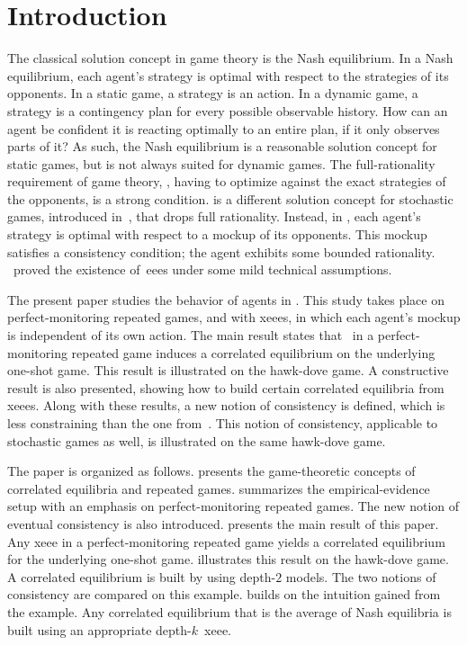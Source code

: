\section{Introduction}

The classical solution concept in game theory is the Nash equilibrium.
In a Nash equilibrium, each agent's strategy is optimal with respect to the strategies of its opponents.
In a static game, a strategy is an action.
In a dynamic game, a strategy is a contingency plan for every possible observable history.
How can an agent be confident it is reacting optimally to an entire plan, if it only observes parts of it?
As such, the Nash equilibrium is a reasonable solution concept for static games, but is not always suited for dynamic games.
The full-rationality requirement of game theory, \ie, having to optimize against the exact strategies of the opponents, is a strong condition.
 is a different solution concept for stochastic games, introduced in~\cite{dudebout_shamma:2012}, that drops full rationality.
Instead, in , each agent's strategy is optimal with respect to a mockup of its opponents.
This mockup satisfies a consistency condition; the agent exhibits some bounded rationality.
\cite{dudebout_shamma:2012}~proved the existence of~\acp{eee} under some mild technical assumptions.

The present paper studies the behavior of agents in .
This study takes place on perfect-monitoring repeated games, and with \acp{xeee}, in which each agent's mockup is independent of its own action.
The main result states that~ in a perfect-monitoring repeated game induces a correlated equilibrium on the underlying one-shot game.
This result is illustrated on the hawk-dove game.
A constructive result is also presented, showing how to build certain correlated equilibria from \acp{xeee}.
Along with these results, a new notion of consistency is defined, which is less constraining than the one from~\cite{dudebout_shamma:2012}.
This notion of consistency, applicable to stochastic games as well, is illustrated on the same hawk-dove game.

The paper is organized as follows.
 presents the game-theoretic concepts of correlated equilibria and repeated games.
 summarizes the empirical-evidence setup with an emphasis on perfect-monitoring repeated games.
The new notion of eventual consistency is also introduced.
 presents the main result of this paper.
Any \ac{xeee} in a perfect-monitoring repeated game yields a correlated equilibrium for the underlying one-shot game.
 illustrates this result on the hawk-dove game.
A correlated equilibrium is built by using depth-\(2\) models.
The two notions of consistency are compared on this example.
 builds on the intuition gained from the example.
Any correlated equilibrium that is the average of Nash equilibria is built using an appropriate depth-\(k\)~\ac{xeee}.

